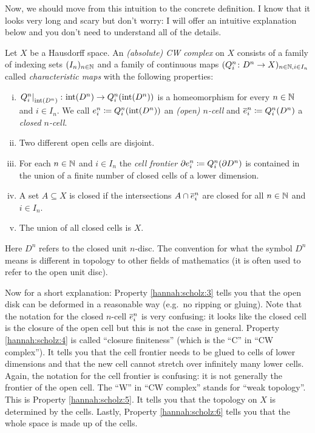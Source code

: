 Now, we should move from this intuition to the concrete definition. I know that it looks very long and scary but don't worry: I will offer an intuitive explanation below and you don't need to understand all of the details. 

\begin{definition}\label{hannah:scholz:7}
Let $X$ be a Hausdorff space. 
An \emph{(absolute) CW complex} on $X$ consists of a family of indexing sets $(I_n)_{n \in \N}$ and a family of continuous maps $(Q_i^n \colon D^n \to X)_{n \in \N, i \in I_n}$ called \emph{characteristic maps} with the following properties: 
\begin{enumerate}[(i)]
    \item $\restrict{Q_i^n}{\interior{D^n}} \colon \interior{D^n} \to Q_i^n(\interior{D^n})$ is a homeomorphism for every $n \in \N$ and $i \in I_n$. We call $\openCell{n}{i} \coloneq Q_i^n(\interior{D^n})$ an \emph{(open) $n$-cell} and $\closedCell{n}{i} \coloneq Q_i^n(D^n)$ a \emph{closed $n$-cell}. \label{hannah:scholz:3}
    \item Two different open cells are disjoint. \label{hannah:scholz:8}
    \item For each $n \in \N$ and $i \in I_n$ the \emph{cell frontier} $\cellFrontier{n}{i} \coloneq Q_i^n(\boundary D^n)$ is contained in the union of a finite number of closed cells of a lower dimension. \label{hannah:scholz:4}
    \item A set $A \subseteq X$ is closed if the intersections $A \cap \closedCell{n}{i}$ are closed for all $n \in \N$ and $i \in I_n$. \label{hannah:scholz:5}
    \item The union of all closed cells is $X$. \label{hannah:scholz:6}
\end{enumerate}
\end{definition}

Here $D^n$ refers to the closed unit $n$-disc. The convention for what the symbol $D^n$ means is different in topology to other fields of mathematics (it is often used to refer to the open unit disc). 

Now for a short explanation: Property \ref{hannah:scholz:3} tells you that the open disk can be deformed in a reasonable way (e.g.\ no ripping or gluing). Note that the notation for the closed $n$-cell $\closedCell{n}{i}$ is very confusing: it looks like the closed cell is the closure of the open cell but this is not the case in general. Property \ref{hannah:scholz:4} is called ``closure finiteness'' (which is the ``C'' in ``CW complex''). It tells you that the cell frontier needs to be glued to cells of lower dimensions and that the new cell cannot stretch over infinitely many lower cells. Again, the notation for the cell frontier is confusing: it is not generally the frontier of the open cell. The ``W'' in ``CW complex'' stands for ``weak topology''. This is Property \ref{hannah:scholz:5}. It tells you that the topology on $X$ is determined by the cells. Lastly, Property \ref{hannah:scholz:6} tells you that the whole space is made up of the cells. 

